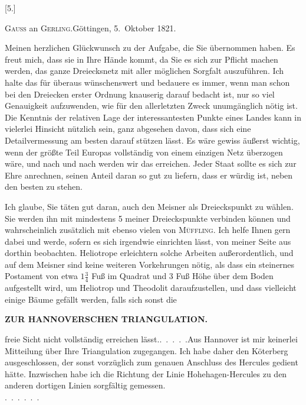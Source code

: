 \begin{center}
[5.]
\end{center}
\begin{center}
\textsc{Gauss} an \textsc{Gerling}.\quad Göttingen, 5.~Oktober 1821.
\end{center}

\par\noindent\hspace*{\parindent}Meinen herzlichen Glückwunsch zu der Aufgabe, die Sie übernommen haben.
Es freut mich, dass sie in Ihre Hände kommt, da Sie es sich zur Pflicht machen werden, das ganze Dreiecksnetz mit aller möglichen Sorgfalt auszuführen.
Ich halte das für überaus wünschenswert und bedauere es immer, wenn man schon bei den Dreiecken erster Ordnung knauserig darauf bedacht ist, nur so viel Genauigkeit aufzuwenden, wie für den allerletzten Zweck unumgänglich nötig ist.
Die  Kenntnis der relativen Lage der interessantesten Punkte eines Landes kann in vielerlei Hinsicht nützlich sein, ganz abgesehen davon, dass sich eine Detailvermessung am besten darauf stützen lässt.
Es wäre gewiss äußerst wichtig, wenn der größte Teil Europas vollständig von einem einzigen Netz überzogen wäre, und nach und nach werden wir das erreichen. Jeder Staat sollte es sich zur Ehre anrechnen, seinen Anteil daran so gut zu liefern, dass er würdig ist, neben den besten zu stehen.

\par\noindent\hspace*{\parindent}Ich glaube, Sie täten gut daran, auch den Meisner als Dreieckspunkt zu wählen. Sie werden ihn  mit mindestens 5 meiner Dreieckspunkte verbinden können und wahrscheinlich zusätzlich mit ebenso vielen von \textsc{Müffling}.
Ich helfe Ihnen gern dabei und werde, sofern es sich irgendwie einrichten lässt, von meiner Seite aus dorthin beobachten.
Heliotrope erleichtern solche Arbeiten außerordentlich, und auf dem Meisner sind keine weiteren Vorkehrungen nötig, als dass ein steinernes Postament von etwa \(1\frac{3}{4}\) Fuß im Quadrat und 3 Fuß Höhe über dem Boden aufgestellt wird, um Heliotrop und Theodolit daraufzustellen, und dass vielleicht einige Bäume gefällt werden, falls sich sonst die
\par\clearpage
\noindent\null\hfill{\small\textbf{ZUR HANNOVERSCHEN TRIANGULATION.}}\hfill{}\par\medskip
\noindent freie Sicht nicht vollständig erreichen lässt.\quad\mbox{.\ .\ .\ .\ .}\quad Aus Hannover ist mir keinerlei Mitteilung über Ihre Triangulation zugegangen. Ich habe daher den Köterberg ausgeschlossen, der sonst vorzüglich zum genauen Anschluss des Hercules gedient hätte.
Inzwischen habe ich die Richtung der Linie Hohehagen-Hercules zu den anderen dortigen Linien sorgfältig gemessen.\\
\mbox{.\ .\ .\ .\ .\ .}
